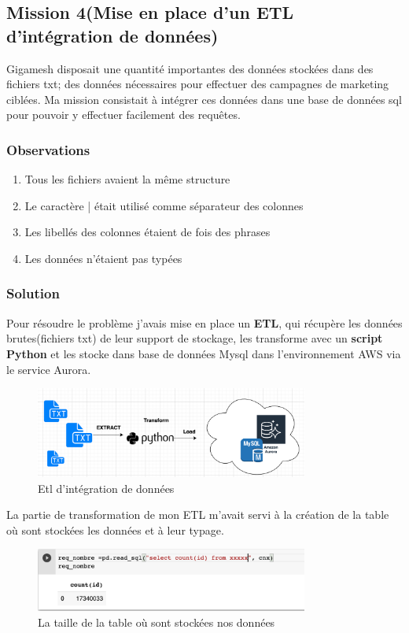 \newpage
\subsection{Mission 4(Mise en place d'un ETL d'intégration de données)}
Gigamesh disposait une quantité importantes des données stockées dans des fichiers txt; des données nécessaires pour effectuer des campagnes de marketing ciblées. Ma mission consistait à intégrer ces données dans une base de données sql pour pouvoir y effectuer facilement  des requêtes.

\subsubsection{Observations}
\begin{enumerate}
\item Tous les fichiers avaient la même structure
\item Le caractère | était utilisé comme séparateur des colonnes
\item Les libellés des colonnes étaient de fois des phrases
\item Les données n'étaient pas typées
\end{enumerate}
\subsubsection{Solution}
Pour résoudre le problème j'avais mise en place un \textbf{ETL}, qui récupère les données brutes(fichiers txt) de leur support de stockage, les transforme avec un \textbf{script Python} et les stocke dans base de données Mysql dans l'environnement AWS via le service Aurora. 

 \begin{figure}[H]
            \centering
                \includegraphics[width=0.8\textwidth]{Figures/etls}
	       \decoRule
		\caption[Etl d'intégration de données]{Etl d'intégration de données}
	\label{fig:etl}
	\end{figure}
La partie de transformation de mon ETL m'avait servi à la création de la table où sont stockées les données et à leur typage. 
 \begin{figure}[H]
            \centering
                \includegraphics[width=0.8\textwidth]{Figures/nombre}
	       \decoRule
		\caption[La taille de la table où sont stockées nos données]{La taille de la table où sont stockées nos données}
	\label{fig:La taille de la table où sont stockées nos données}
	\end{figure}
